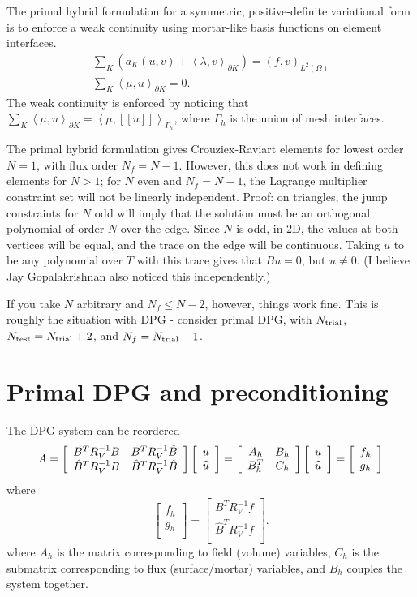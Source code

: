 \documentclass{article}
\newcommand{\LRp}[1]{\left( #1 \right)}
\newcommand{\LRs}[1]{\left[ #1 \right]}
\newcommand{\LRa}[1]{\left\langle #1 \right\rangle}
\newcommand{\jump}[1] {\ensuremath{\LRs{\![#1]\!}}}
\newcommand{\uh}{\widehat{u}}
\renewcommand{\L}{L^2\LRp{\Omega}}
\def\arr#1#2#3#4{\left[
\begin{array}{cc}
#1 & #2\\
#3 & #4\\
\end{array}
\right]}
\def\vecttwo#1#2{\left[
\begin{array}{c}
#1\\
#2\\
\end{array}
\right]}
\begin{document}
The primal hybrid formulation for a symmetric, positive-definite variational form is to enforce a weak continuity using mortar-like basis functions on element interfaces.
\begin{align*}
\sum_K (a_K(u,v) + \LRa{\lambda, v}_{\partial K}) = (f,v)_{\L}\\
\sum_K \LRa{\mu, u}_{\partial K} = 0.
\end{align*}
The weak continuity is enforced by noticing that $\sum_K \LRa{\mu, u}_{\partial K} = \LRa{\mu,\jump{u}}_{\Gamma_h}$, where $\Gamma_h$ is the union of mesh interfaces.

The primal hybrid formulation gives Crouziex-Raviart elements for lowest order $N=1$, with flux order $N_f = N-1$.  However, this does not work in defining elements for $N>1$; for $N$ even and $N_f = N-1$, the Lagrange multiplier constraint set will not be linearly independent.   Proof: on triangles, the jump constraints for $N$ odd will imply that the solution must be an orthogonal polynomial of order $N$ over the edge.  Since $N$ is odd, in 2D, the values at both vertices will be equal, and the trace on the edge will be continuous.  Taking $u$ to be any polynomial over $T$ with this trace gives that $Bu = 0$, but $u\neq 0$.  (I believe Jay Gopalakrishnan also noticed this independently.)

If you take $N$ arbitrary and $N_f \leq N-2$, however, things work fine.  This is roughly the situation with DPG - consider primal DPG, with $N_{\rm trial}$, $N_{\rm test} = N_{\rm trial} + 2$, and $N_f = N_{\rm trial} - 1$.  

%

\section{Primal DPG and preconditioning}

The DPG system can be reordered 
\[
A = \left[\begin{array}{c c}
B^TR_V^{-1}B & B^TR_V^{-1}\hat{B}\\
\hat{B}^TR_V^{-1}B & \hat{B}^TR_V^{-1}\hat{B}
\end{array}
\right]\vecttwo{u}{\uh} = \arr{A_h}{B_h}{B_h^T}{C_h}\vecttwo{u}{\uh} = \vecttwo{f_h}{g_h}
\]
where 
\[
\vecttwo{f_h}{g_h} = \vecttwo{B^TR_V^{-1} f}{\hat{B}^TR_V^{-1}f}.
\]
where $A_h$ is the matrix corresponding to field (volume) variables, $C_h$ is the submatrix corresponding to flux (surface/mortar) variables, and $B_h$ couples the system together.  
\end{document}
